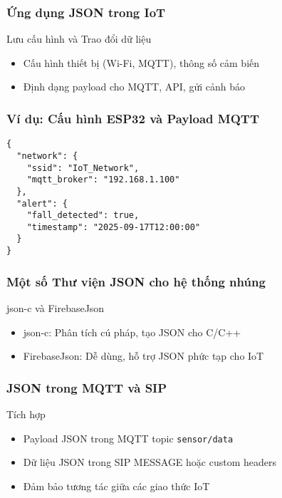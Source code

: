 \begin{frame}
\frametitle{Ứng dụng JSON trong IoT}

\begin{block}{Lưu cấu hình và Trao đổi dữ liệu}
\begin{itemize}
\item Cấu hình thiết bị (Wi-Fi, MQTT), thông số cảm biến
\item Định dạng payload cho MQTT, API, gửi cảnh báo
\end{itemize}
\end{block}

\end{frame}

\begin{frame}[fragile]
\frametitle{Ví dụ: Cấu hình ESP32 và Payload MQTT}
\begin{verbatim}
{
  "network": {
    "ssid": "IoT_Network",
    "mqtt_broker": "192.168.1.100"
  },
  "alert": {
    "fall_detected": true,
    "timestamp": "2025-09-17T12:00:00"
  }
}
\end{verbatim}
\end{frame}

\begin{frame}
\frametitle{Một số Thư viện JSON cho hệ thống nhúng}

\begin{block}{json-c và FirebaseJson}
\begin{itemize}
\item json-c: Phân tích cú pháp, tạo JSON cho C/C++
\item FirebaseJson: Dễ dùng, hỗ trợ JSON phức tạp cho IoT
\end{itemize}
\end{block}

\end{frame}

\begin{frame}
\frametitle{JSON trong MQTT và SIP}

\begin{block}{Tích hợp}
\begin{itemize}
\item Payload JSON trong MQTT topic \texttt{sensor/data}
\item Dữ liệu JSON trong SIP MESSAGE hoặc custom headers
\item Đảm bảo tương tác giữa các giao thức IoT
\end{itemize}
\end{block}

\end{frame}

